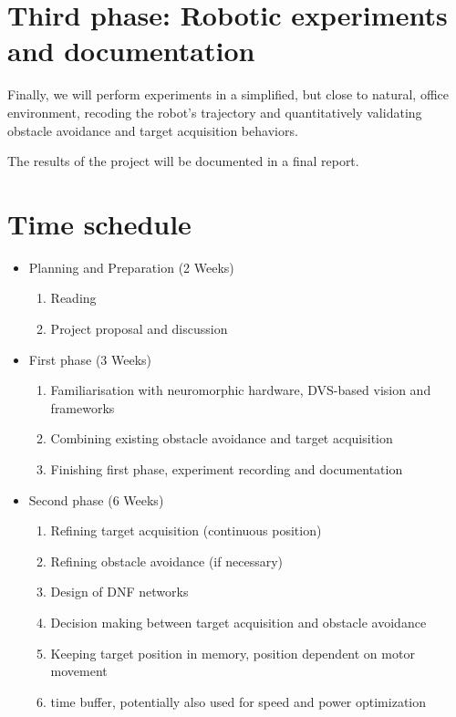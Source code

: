 \documentclass[a4paper, twocolumn]{article}
\begin{document}
\section*{Third phase: Robotic experiments and documentation}
Finally, we will perform experiments in a simplified, but close to natural, office environment, recoding the robot’s trajectory and quantitatively validating obstacle avoidance and target acquisition behaviors. 

The results of the project will be documented in a final report.

\newpage

\section*{Time schedule}
\begin{itemize}
    \item[] Planning and Preparation (2 Weeks)
    \begin{enumerate}
        \item Reading
        \item Project proposal and discussion
        \setcounter{remember}{\value{enumi}}
    \end{enumerate}
    
    \item[] First phase (3 Weeks)
    \begin{enumerate}
        \setcounter{enumi}{\value{remember}}
        \item Familiarisation with neuromorphic hardware, DVS-based vision and frameworks
        \item Combining existing obstacle avoidance and target acquisition
        \item Finishing first phase, experiment recording and documentation
        \setcounter{remember}{\value{enumi}}
    \end{enumerate}
    
    \item[] Second phase (6 Weeks)
    \begin{enumerate}
        \setcounter{enumi}{\value{remember}}
        \item Refining target acquisition (continuous position)
        \item Refining obstacle avoidance (if necessary)
        \item Design of DNF networks
        \item Decision making between target acquisition and obstacle avoidance
        \item Keeping target position in memory, position dependent on motor movement
        \item time buffer, potentially also used for speed and power optimization
        \setcounter{remember}{\value{enumi}}
    \end{enumerate}
    

\end{itemize}
\end{document}
